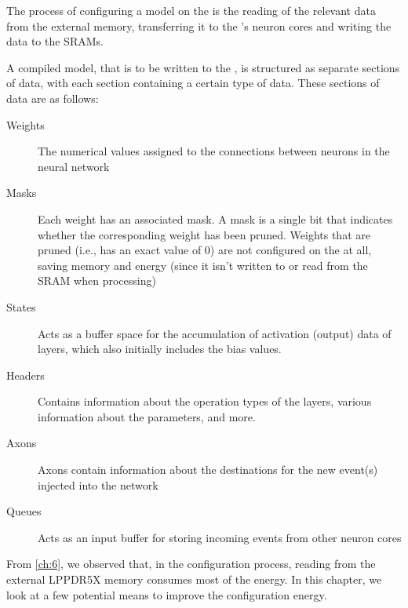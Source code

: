 The process of configuring a model on the \graicore{} is the reading of the relevant data from the external memory, transferring it to the \graicore{}'s neuron cores and writing the data to the SRAMs.

A compiled model, that is to be written to the \graicore{}, is structured as separate sections of data, with each section containing a certain type of data.
These sections of data are as follows:
\begin{description}
    \item[Weights] 
    The numerical values assigned to the connections between neurons in the neural network
    \item[Masks] 
    Each weight has an associated mask.
    A mask is a single bit that indicates whether the corresponding weight has been pruned.
    Weights that are pruned (i.e., has an exact value of $0$) are not configured on the \graicore{} at all, saving memory and energy (since it isn't written to or read from the SRAM when processing)
    \item[States] 
    Acts as a buffer space for the accumulation of activation (output) data of layers, which also initially includes the bias values.
    \item[Headers] 
    Contains information about the operation types of the layers, various information about the parameters, and more.
    \item[Axons] 
    Axons contain information about the destinations for the new event(s) injected into the network
    \item[Queues] 
    Acts as an input buffer for storing incoming events from other neuron cores 
\end{description}

From \cref{ch:6}, we observed that, in the configuration process, reading from the external LPPDR5X memory consumes most of the energy.
In this chapter, we look at a few potential means to improve the configuration energy.
